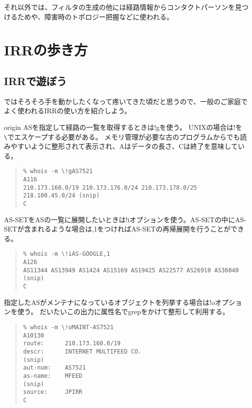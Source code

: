 それ以外では、フィルタの生成の他には経路情報からコンタクトパーソンを見つけるためや、障害時のトポロジー把握などに使われる。

\newpage

\section{IRRの歩き方}

\subsection{IRRで遊ぼう}
ではそろそろ手を動かしたくなって疼いてきた頃だと思うので、一般のご家庭でよく使われるIRRの使い方を紹介しよう。

origin ASを指定して経路の一覧を取得するときは!gを使う。
UNIXの場合は!を\verb+\+でエスケープする必要がある。
メモリ管理が必要な古のプログラムからでも読みやすいように整形されて表示され、Aはデータの長さ、Cは終了を意味している。

\begin{quote}
\begin{minilinespace}
\begin{verbatim}
% whois -m \!gAS7521
A116
210.173.160.0/19 210.173.176.0/24 210.173.178.0/25 218.100.45.0/24 (snip)
C
\end{verbatim}
\end{minilinespace}
\end{quote}

AS-SETをASの一覧に展開したいときは!iオプションを使う。AS-SETの中にAS-SETが含まれるような場合は,1をつければAS-SETの再帰展開を行うことができる。

\begin{quote}
\begin{minilinespace}
\begin{verbatim}
% whois -m \!iAS-GOOGLE,1 
A126
AS11344 AS13949 AS1424 AS15169 AS19425 AS22577 AS26910 AS36040 (snip)
C
\end{verbatim}
\end{minilinespace}
\end{quote}

指定したASがメンテナになっているオブジェクトを列挙する場合は!oオプションを使う。
だいたいこの出力に属性名でgrepをかけて整形して利用する。

\begin{quote}
\begin{minilinespace}
\begin{verbatim}
% whois -m \!oMAINT-AS7521 
A10130
route:      210.173.160.0/19
descr:      INTERNET MULTIFEED CO.
(snip)
aut-num:    AS7521
as-name:    MFEED
(snip)
source:     JPIRR
C
\end{verbatim}
\end{minilinespace}
\end{quote}

